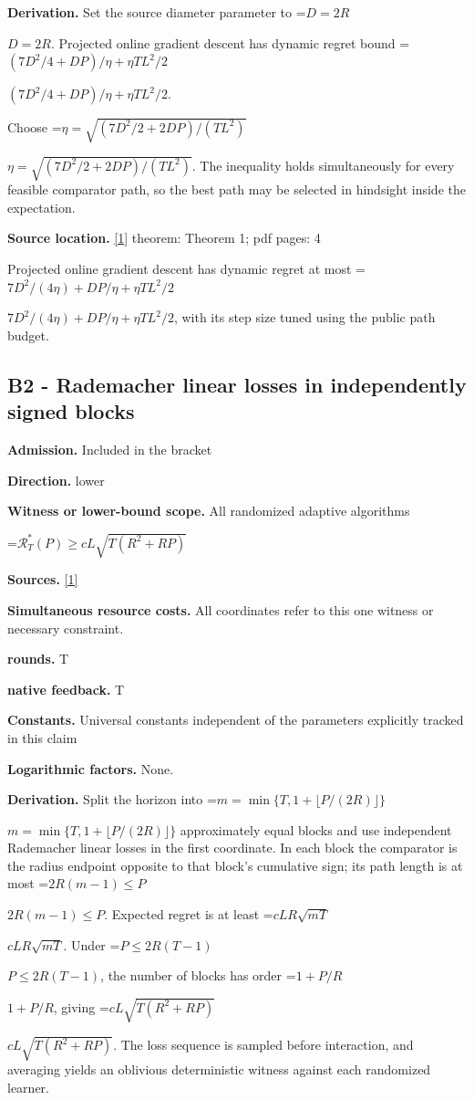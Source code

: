 \documentclass[10pt,a4paper]{article}
\newcommand{\AtlasMath}[1]{\par\begingroup\centering\setbox0=\hbox{$\displaystyle #1$}\ifdim\wd0>1.4\linewidth\typeout{ATLAS WIDE FORMULA: \the\wd0}\fi\ifdim\wd0>\linewidth\resizebox{\linewidth}{!}{\box0}\else\box0\fi\par\endgroup}
\newcommand{\AtlasInlineMath}[1]{\begingroup\setbox0=\hbox{$#1$}\ifdim\wd0>.4\linewidth\endgroup\AtlasMath{#1}\else\endgroup$#1$\fi}
\begin{document}
\textbf{Derivation.} Set the source diameter parameter to \AtlasInlineMath{D=2R}. Projected online gradient descent has dynamic regret bound \AtlasInlineMath{(7D^2/4+DP)/\eta+\eta TL^2/2}.

Choose \AtlasInlineMath{\eta=\sqrt{(7D^2/2+2DP)/(TL^2)}}. The inequality holds simultaneously for every feasible comparator path, so the best path may be selected in hindsight inside the expectation.

\textbf{Source location.} \href{https://www.lamda.nju.edu.cn/lusy/pdf/zhang2018adaptive.pdf}{[1]} theorem: Theorem 1; pdf pages: 4

Projected online gradient descent has dynamic regret at most \AtlasInlineMath{7D^2/(4\eta)+DP/\eta+\eta TL^2/2}, with its step size tuned using the public path budget.

\subsection{B2 - Rademacher linear losses in independently signed blocks}
\textbf{Admission.} Included in the bracket

\textbf{Direction.} lower

\textbf{Witness or lower-bound scope.} All randomized adaptive algorithms

\AtlasMath{\mathcal{R}_T^*(P)\ge c L\sqrt{T(R^2+RP)}}
\textbf{Sources.} \href{https://www.lamda.nju.edu.cn/lusy/pdf/zhang2018adaptive.pdf}{[1]}

\textbf{Simultaneous resource costs.} All coordinates refer to this one witness or necessary constraint.

\textbf{rounds.} T

\textbf{native feedback.} T

\textbf{Constants.} Universal constants independent of the parameters explicitly tracked in this claim

\textbf{Logarithmic factors.} None.

\textbf{Derivation.} Split the horizon into \AtlasInlineMath{m=\min\{T,1+\lfloor P/(2R)\rfloor\}} approximately equal blocks and use independent Rademacher linear losses in the first coordinate. In each block the comparator is the radius endpoint opposite to that block's cumulative sign; its path length is at most \AtlasInlineMath{2R(m-1)\le P}. Expected regret is at least \AtlasInlineMath{cLR\sqrt{mT}}. Under \AtlasInlineMath{P\le2R(T-1)}, the number of blocks has order \AtlasInlineMath{1+P/R}, giving \AtlasInlineMath{cL\sqrt{T(R^2+RP)}}. The loss sequence is sampled before interaction, and averaging yields an oblivious deterministic witness against each randomized learner.
\end{document}
